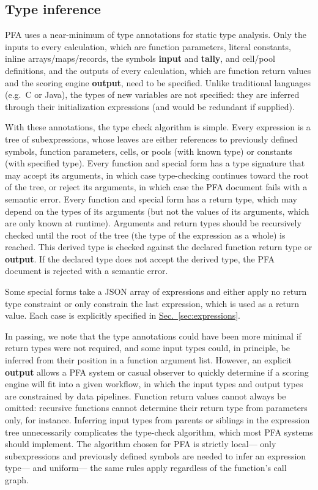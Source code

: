 \documentclass{article}
\newcommand{\PFAc}{\ttfamily\bfseries}
\theoremstyle{definition}
\begin{document}
\hypertarget{hsec:type-inference}{}
\subsection{Type inference}
\label{sec:type-inference}

PFA uses a near-minimum of type annotations for static type analysis.  Only the inputs to every calculation, which are function parameters, literal constants, inline arrays/maps/records, the symbols {\PFAc input} and {\PFAc tally}, and cell/pool definitions, and the outputs of every calculation, which are function return values and the scoring engine {\PFAc output}, need to be specified.  Unlike traditional languages (e.g.\ C or Java), the types of new variables are not specified: they are inferred through their initialization expressions (and would be redundant if supplied).

With these annotations, the type check algorithm is simple.  Every expression is a tree of subexpressions, whose leaves are either references to previously defined symbols, function parameters, cells, or pools (with known type) or constants (with specified type).  Every function and special form has a type signature that may accept its arguments, in which case type-checking continues toward the root of the tree, or reject its arguments, in which case the PFA document fails with a semantic error.  Every function and special form has a return type, which may depend on the types of its arguments (but not the values of its arguments, which are only known at runtime).  Arguments and return types should be recursively checked until the root of the tree (the type of the expression as a whole) is reached.  This derived type is checked against the declared function return type or {\PFAc output}.  If the declared type does not accept the derived type, the PFA document is rejected with a semantic error.

Some special forms take a JSON array of expressions and either apply no return type constraint or only constrain the last expression, which is used as a return value.  Each case is explicitly specified in \hyperlink{hsec:expressions}{Sec.~\ref{sec:expressions}}.

In passing, we note that the type annotations could have been more minimal if return types were not required, and some input types could, in principle, be inferred from their position in a function argument list.  However, an explicit {\PFAc output} allows a PFA system or casual observer to quickly determine if a scoring engine will fit into a given workflow, in which the input types and output types are constrained by data pipelines.  Function return values cannot always be omitted: recursive functions cannot determine their return type from parameters only, for instance.  Inferring input types from parents or siblings in the expression tree unnecessarily complicates the type-check algorithm, which most PFA systems should implement.  The algorithm chosen for PFA is strictly local--- only subexpressions and previously defined symbols are needed to infer an expression type--- and uniform--- the same rules apply regardless of the function's call graph.
\end{document}
